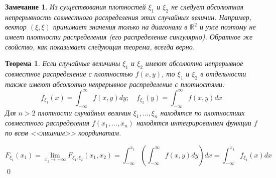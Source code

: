 \documentclass[oneside,final,14pt]{extreport}
\renewenvironment{proof}{{\bfseries Доказательство.}}{\qed}
\newtheorem{thm}{Теорема}[section]
\newtheorem*{rmrk}{Замечание}
\theoremstyle{definition}
\begin{document}
\begin{rmrk}
    Из существования плотностей $\xi_1$ и $\xi_2$ не следует абсолютная непрерывность совместного распределения этих случайных величин. Например, вектор $(\xi, \xi)$ принимает значения только на диагонали в $\mathbb{R}^2$ и уже поэтому не имеет плотности распределения (его распределение сингулярно). Обратное же свойство, как показывает следующая теорема, всегда верно.
\end{rmrk}

\begin{thm}
    Если случайные величины $\xi_1$ и $\xi_2$ имеют абсолютно непрерывное совместное распределение с плотностью $f(x, y)$, то $\xi_1$ и $\xi_2$ в отдельности также имеют абсолютно непрерывное распределение с плотностями:
    \begin{equation*}
        f_{\xi_{1}}(x)=\int_{-\infty}^{\infty} f(x, y) d y ; \quad f_{\xi_{2}}(y)=\int_{-\infty}^{\infty} f(x, y) d x
    \end{equation*}
    Для $n > 2$ плотности случайных величин $\xi_1, \ldots, \xi_n$ находятся по плотностиих совместного распределения $f(x_1, \ldots, x_n)$ находятся интегрированием функции $f$ по всем <<лишним>> координатам.
\end{thm}
\begin{proof}
\begin{equation*}
    F_{\xi_{1}}\left(x_{1}\right)
    = \lim _{x_{2} \rightarrow+\infty} F_{\xi_{1}, \xi_{2}}\left(x_{1}, x_{2}\right)
    = 
    \boxed{\int_{-\infty}^{x_{1}}\left(\int_{-\infty}^{\infty} f(x, y) d y\right) d x
    = \int_{-\infty}^{x_{1}} f_{\xi_{1}}(x) d x}
\end{equation*}
\end{proof}
\end{document}
